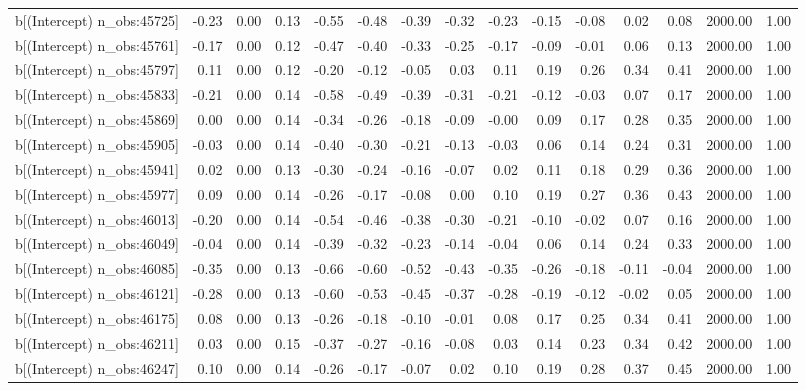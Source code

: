 \begin{table}[ht]
\begin{tabular}{rrrrrrrrrrrrrrr}
  b[(Intercept) n\_obs:45725] & -0.23 & 0.00 & 0.13 & -0.55 & -0.48 & -0.39 & -0.32 & -0.23 & -0.15 & -0.08 & 0.02 & 0.08 & 2000.00 & 1.00 \\ 
  b[(Intercept) n\_obs:45761] & -0.17 & 0.00 & 0.12 & -0.47 & -0.40 & -0.33 & -0.25 & -0.17 & -0.09 & -0.01 & 0.06 & 0.13 & 2000.00 & 1.00 \\ 
  b[(Intercept) n\_obs:45797] & 0.11 & 0.00 & 0.12 & -0.20 & -0.12 & -0.05 & 0.03 & 0.11 & 0.19 & 0.26 & 0.34 & 0.41 & 2000.00 & 1.00 \\ 
  b[(Intercept) n\_obs:45833] & -0.21 & 0.00 & 0.14 & -0.58 & -0.49 & -0.39 & -0.31 & -0.21 & -0.12 & -0.03 & 0.07 & 0.17 & 2000.00 & 1.00 \\ 
  b[(Intercept) n\_obs:45869] & 0.00 & 0.00 & 0.14 & -0.34 & -0.26 & -0.18 & -0.09 & -0.00 & 0.09 & 0.17 & 0.28 & 0.35 & 2000.00 & 1.00 \\ 
  b[(Intercept) n\_obs:45905] & -0.03 & 0.00 & 0.14 & -0.40 & -0.30 & -0.21 & -0.13 & -0.03 & 0.06 & 0.14 & 0.24 & 0.31 & 2000.00 & 1.00 \\ 
  b[(Intercept) n\_obs:45941] & 0.02 & 0.00 & 0.13 & -0.30 & -0.24 & -0.16 & -0.07 & 0.02 & 0.11 & 0.18 & 0.29 & 0.36 & 2000.00 & 1.00 \\ 
  b[(Intercept) n\_obs:45977] & 0.09 & 0.00 & 0.14 & -0.26 & -0.17 & -0.08 & 0.00 & 0.10 & 0.19 & 0.27 & 0.36 & 0.43 & 2000.00 & 1.00 \\ 
  b[(Intercept) n\_obs:46013] & -0.20 & 0.00 & 0.14 & -0.54 & -0.46 & -0.38 & -0.30 & -0.21 & -0.10 & -0.02 & 0.07 & 0.16 & 2000.00 & 1.00 \\ 
  b[(Intercept) n\_obs:46049] & -0.04 & 0.00 & 0.14 & -0.39 & -0.32 & -0.23 & -0.14 & -0.04 & 0.06 & 0.14 & 0.24 & 0.33 & 2000.00 & 1.00 \\ 
  b[(Intercept) n\_obs:46085] & -0.35 & 0.00 & 0.13 & -0.66 & -0.60 & -0.52 & -0.43 & -0.35 & -0.26 & -0.18 & -0.11 & -0.04 & 2000.00 & 1.00 \\ 
  b[(Intercept) n\_obs:46121] & -0.28 & 0.00 & 0.13 & -0.60 & -0.53 & -0.45 & -0.37 & -0.28 & -0.19 & -0.12 & -0.02 & 0.05 & 2000.00 & 1.00 \\ 
  b[(Intercept) n\_obs:46175] & 0.08 & 0.00 & 0.13 & -0.26 & -0.18 & -0.10 & -0.01 & 0.08 & 0.17 & 0.25 & 0.34 & 0.41 & 2000.00 & 1.00 \\ 
  b[(Intercept) n\_obs:46211] & 0.03 & 0.00 & 0.15 & -0.37 & -0.27 & -0.16 & -0.08 & 0.03 & 0.14 & 0.23 & 0.34 & 0.42 & 2000.00 & 1.00 \\ 
  b[(Intercept) n\_obs:46247] & 0.10 & 0.00 & 0.14 & -0.26 & -0.17 & -0.07 & 0.02 & 0.10 & 0.19 & 0.28 & 0.37 & 0.45 & 2000.00 & 1.00 \\ 

\end{tabular}
\end{table}
